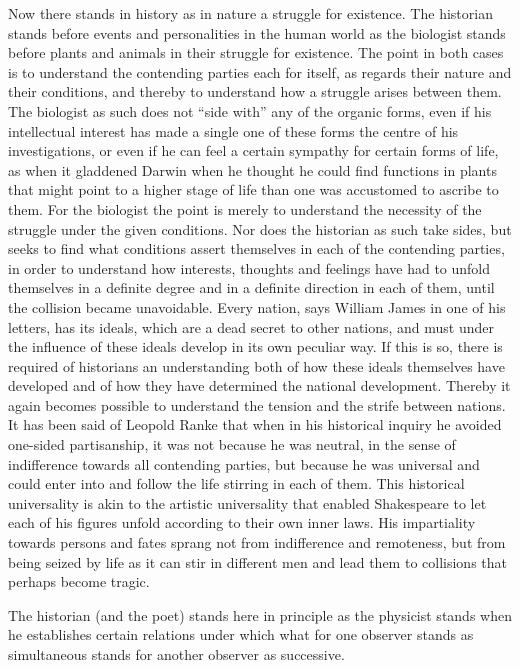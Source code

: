 \documentclass[12pt]{article}
\newcommand{\opage}[1]{\marginnote{\footnotesize\textit{[#1]}}}
\begin{document}
Now there stands in history as in nature a struggle for existence. The
historian stands before events and \opage{80}personalities in the human world as the
biologist stands before plants and animals in their struggle for existence.
The point in both cases is to understand the contending parties each for
itself, as regards their nature and their conditions, and thereby to
understand how a struggle arises between them. The biologist as such does
not ``side with'' any of the organic forms, even if his intellectual
interest has made a single one of these forms the centre of his
investigations, or even if he can feel a certain sympathy for certain forms
of life, as when it gladdened Darwin when he thought he could find functions
in plants that might point to a higher stage of life than one was accustomed
to ascribe to them. For the biologist the point is merely to understand the
necessity of the struggle under the given conditions. Nor does the historian
as such take sides, but seeks to find what conditions assert themselves in
each of the contending parties, in order to understand how interests,
thoughts and feelings have had to unfold themselves in a definite degree and
in a definite direction in each of them, until the collision became
unavoidable. Every nation, says William James in one of his letters, has its
ideals, which are a dead secret to other nations, and must under the
influence of these ideals develop in its own peculiar way. If this is so,
there is required of historians an understanding both of how these ideals
themselves have developed and of how they have determined the national
development. Thereby it again becomes possible to understand the tension and
the strife between nations. It has been said of Leopold Ranke that when in
his historical inquiry he avoided one-sided partisanship, it was not because
he was neutral, in the sense of indifference towards all contending parties,
but because he was universal and could enter into and follow \opage{81}the life
stirring in each of them. This historical universality is akin to the
artistic universality that enabled Shakespeare to let each of his figures
unfold according to their own inner laws. His impartiality towards persons
and fates sprang not from indifference and remoteness, but from being seized
by life as it can stir in different men and lead them to collisions that
perhaps become tragic.

The historian (and the poet) stands here in principle as the physicist
stands when he establishes certain relations under which what for one
observer stands as simultaneous stands for another observer as successive.
\end{document}
